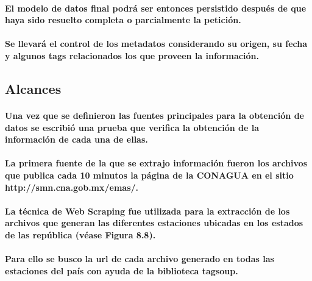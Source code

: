   \paragraph{El modelo de datos final podrá ser entonces persistido después de que haya sido resuelto completa o parcialmente la petición.} 
  \paragraph{Se llevará el control de los metadatos considerando su origen, su fecha y algunos tags relacionados los que proveen la información.}
  \newpage

  \subsection{Alcances}
  
    \paragraph{Una vez que se definieron las fuentes principales para la obtención de datos se escribió una prueba que verifica la obtención de la información de cada una de ellas.} 
    \paragraph{La primera fuente de la que se extrajo información fueron los archivos que publica cada 10 minutos la página de la CONAGUA en el sitio \textbf{http://smn.cna.gob.mx/emas/}.}
    \paragraph{La técnica de Web Scraping fue utilizada para la extracción de los archivos que generan las diferentes estaciones ubicadas en los estados de las república (véase Figura 8.8).}
    \paragraph{Para ello se busco la url de cada archivo generado en todas las estaciones del país con ayuda de la biblioteca \textbf{tagsoup}.}
